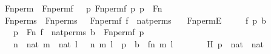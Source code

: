 \begin{isabellebody}
\isamarkupfalse%
\ Fn{\isacharunderscore}{\kern0pt}perm{\isacharprime}{\kern0pt}\ \ {\isachardoublequoteopen}Fn{\isacharunderscore}{\kern0pt}perm{\isacharprime}{\kern0pt}{\isacharparenleft}{\kern0pt}f{\isacharparenright}{\kern0pt}\ {\isasymequiv}\ {\isacharbraceleft}{\kern0pt}\ {\isacharless}{\kern0pt}p{\isacharcomma}{\kern0pt}\ Fn{\isacharunderscore}{\kern0pt}perm{\isacharparenleft}{\kern0pt}f{\isacharcomma}{\kern0pt}\ p{\isacharparenright}{\kern0pt}{\isachargreater}{\kern0pt}{\isachardot}{\kern0pt}\ p\ {\isasymin}\ Fn\ {\isacharbraceright}{\kern0pt}{\isachardoublequoteclose}\ \isanewline
{}\isamarkupfalse%
\ Fn{\isacharunderscore}{\kern0pt}perms\ \ {\isachardoublequoteopen}Fn{\isacharunderscore}{\kern0pt}perms\ {\isasymequiv}\ {\isacharbraceleft}{\kern0pt}\ Fn{\isacharunderscore}{\kern0pt}perm{\isacharprime}{\kern0pt}{\isacharparenleft}{\kern0pt}f{\isacharparenright}{\kern0pt}{\isachardot}{\kern0pt}\ f\ {\isasymin}\ nat{\isacharunderscore}{\kern0pt}perms\ {\isacharbraceright}{\kern0pt}{\isachardoublequoteclose}\ \isanewline
\isanewline
{}\isamarkupfalse%
\ Fn{\isacharunderscore}{\kern0pt}permE\ {\isacharcolon}{\kern0pt}\ \isanewline
\ \ \ f\ p\ b\ \isanewline
\ \ \ {\isachardoublequoteopen}p\ {\isasymin}\ Fn{\isachardoublequoteclose}\ {\isachardoublequoteopen}f\ {\isasymin}\ nat{\isacharunderscore}{\kern0pt}perms{\isachardoublequoteclose}\ {\isachardoublequoteopen}b\ {\isasymin}\ Fn{\isacharunderscore}{\kern0pt}perm{\isacharparenleft}{\kern0pt}f{\isacharcomma}{\kern0pt}\ p{\isacharparenright}{\kern0pt}{\isachardoublequoteclose}\ \isanewline
\ \ \ {\isachardoublequoteopen}{\isasymexists}n\ {\isasymin}\ nat{\isachardot}{\kern0pt}\ {\isasymexists}m\ {\isasymin}\ nat{\isachardot}{\kern0pt}\ {\isasymexists}l\ {\isasymin}\ {}{\isachardot}{\kern0pt}\ {\isacharless}{\kern0pt}{\isacharless}{\kern0pt}n{\isacharcomma}{\kern0pt}\ m{\isachargreater}{\kern0pt}{\isacharcomma}{\kern0pt}\ l{\isachargreater}{\kern0pt}\ {\isasymin}\ p\ {\isasymand}\ b\ {\isacharequal}{\kern0pt}\ {\isacharless}{\kern0pt}{\isacharless}{\kern0pt}f{\isacharbackquote}{\kern0pt}n{\isacharcomma}{\kern0pt}\ m{\isachargreater}{\kern0pt}{\isacharcomma}{\kern0pt}\ l{\isachargreater}{\kern0pt}{\isachardoublequoteclose}\ \isanewline
%
\isadelimproof
%
\endisadelimproof
%
\isatagproof
{}\isamarkupfalse%
\ {\isacharminus}{\kern0pt}\ \isanewline
\ \ \isamarkupfalse%
\ H{\isacharcolon}{\kern0pt}\ {\isachardoublequoteopen}p\ {\isasymsubseteq}\ {\isacharparenleft}{\kern0pt}nat\ {\isasymtimes}\ nat{\isacharparenright}{\kern0pt}\ {\isasymtimes}\ {}{\isachardoublequoteclose}\ \isanewline

\end{isabellebody}
